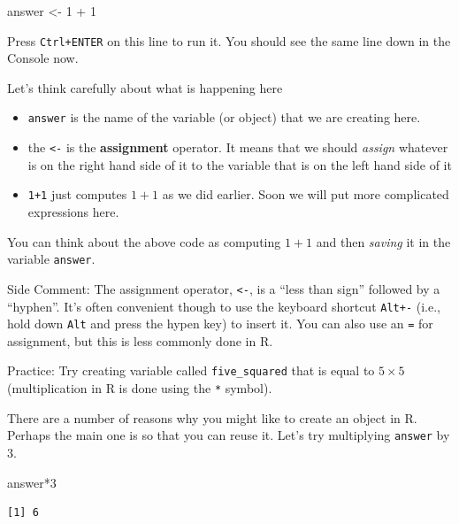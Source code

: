 \documentclass[
  letterpaper,
  DIV=11,
  numbers=noendperiod]{scrreprt}
\newenvironment{Shaded}{\begin{snugshade}}{\end{snugshade}}
\newcommand{\DecValTok}[1]{\textcolor[rgb]{0.68,0.00,0.00}{#1}}
\newcommand{\NormalTok}[1]{\textcolor[rgb]{0.00,0.23,0.31}{#1}}
\newcommand{\OtherTok}[1]{\textcolor[rgb]{0.00,0.23,0.31}{#1}}
\newcommand{\SpecialCharTok}[1]{\textcolor[rgb]{0.37,0.37,0.37}{#1}}
\begin{document}
\begin{Shaded}
\begin{Highlighting}[]
\NormalTok{answer }\OtherTok{\textless{}{-}} \DecValTok{1} \SpecialCharTok{+} \DecValTok{1}
\end{Highlighting}
\end{Shaded}

Press \texttt{Ctrl+ENTER} on this line to run it. You should see the
same line down in the Console now.

Let's think carefully about what is happening here

\begin{itemize}
\item
  \texttt{answer} is the name of the variable (or object) that we are
  creating here.
\item
  the \texttt{\textless{}-} is the \textbf{assignment} operator. It
  means that we should \emph{assign} whatever is on the right hand side
  of it to the variable that is on the left hand side of it
\item
  \texttt{1+1} just computes \(1+1\) as we did earlier. Soon we will put
  more complicated expressions here.
\end{itemize}

You can think about the above code as computing \(1+1\) and then
\emph{saving} it in the variable \texttt{answer}.

{Side Comment:} The assignment operator, \texttt{\textless{}-}, is a
``less than sign'' followed by a ``hyphen''. It's often convenient
though to use the keyboard shortcut \texttt{Alt+-} (i.e., hold down
\texttt{Alt} and press the hypen key) to insert it. You can also use an
\texttt{=} for assignment, but this is less commonly done in R.

{Practice:} Try creating variable called \texttt{five\_squared} that is
equal to \(5 \times 5\) (multiplication in R is done using the
\texttt{*} symbol).

There are a number of reasons why you might like to create an object in
R. Perhaps the main one is so that you can reuse it. Let's try
multiplying \texttt{answer} by \(3\).

\begin{Shaded}
\begin{Highlighting}[]
\NormalTok{answer}\SpecialCharTok{*}\DecValTok{3}
\end{Highlighting}
\end{Shaded}

\begin{verbatim}
[1] 6
\end{verbatim}
\end{document}
